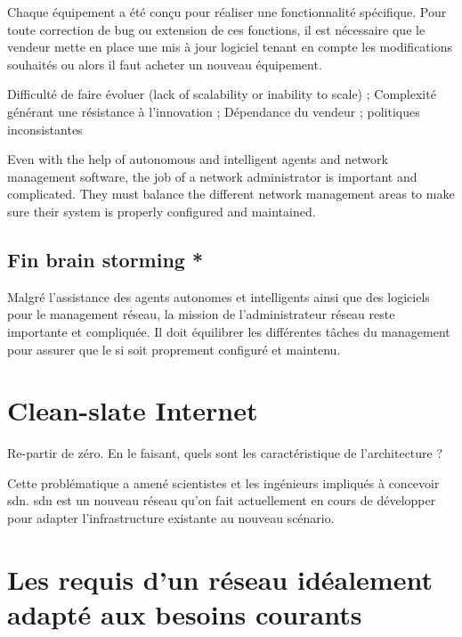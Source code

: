 \par
Chaque équipement a été conçu pour réaliser une fonctionnalité spécifique. Pour toute correction de bug ou extension de ces fonctions,  il est nécessaire que le vendeur mette en place une mis à jour logiciel tenant en compte les modifications souhaités ou alors il faut acheter un nouveau équipement. 

\par Difficulté de faire évoluer (lack of scalability or inability to scale) ; Complexité générant une résistance à l'innovation ; Dépendance du vendeur ; politiques inconsistantes

Even with the help of autonomous and intelligent agents and network management software, the job of a network administrator is important and complicated. They must balance the different network 
management areas to make sure their system is properly configured and maintained. 

\subsection*{Fin brain storming *}

Malgré l'assistance des agents autonomes et intelligents ainsi que des logiciels pour le management réseau, la mission de l'administrateur réseau reste importante et compliquée. Il doit équilibrer les différentes tâches du management pour assurer que le \gls{si} soit proprement configuré et maintenu.


\section{Clean-slate Internet}

Re-partir de zéro. En le faisant, quels sont les caractéristique de l'architecture ?


Cette problématique a amené scientistes et les ingénieurs impliqués à concevoir \gls{sdn}. \gls{sdn} est un nouveau  réseau qu'on fait actuellement en cours de développer pour adapter l'infrastructure existante au nouveau scénario.

\section{Les requis d'un réseau idéalement adapté aux besoins courants}